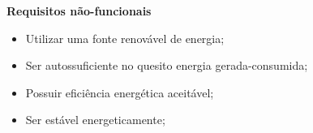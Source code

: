 \begin{itemize}
	  \textbf{Requisitos não-funcionais}
	  \begin{itemize}
	   \item Utilizar uma fonte renovável de energia;
	   \item Ser autossuficiente no quesito energia gerada-consumida;
	   \item Possuir eficiência energética aceitável;
	   \item Ser estável energeticamente;
	  \end{itemize}
	  
      \end{itemize}
    
    
    
    